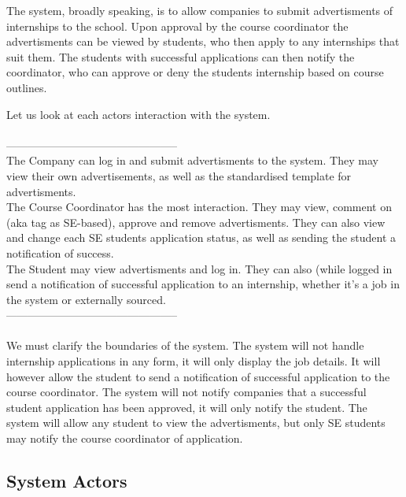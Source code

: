 \documentclass{l3deliverable}
\begin{document}

The system, broadly speaking, is to allow companies to submit advertisments 
of internships to the school. Upon approval by the course coordinator the 
advertisments can be viewed by students, who then apply to any internships 
that suit them. The students with successful applications can then notify 
the coordinator, who can approve or deny the students internship based on 
course outlines. 

Let us look at each actors interaction with the system.\\
\\
-----------------------------------------------\\
The Company can log in and submit advertisments to the system. They may 
view their own advertisements, as well as the standardised template for 
advertisments.\\

The Course Coordinator has the most interaction. They may view, comment 
on (aka tag as SE-based), approve and remove advertisments. They can also 
view and change each SE students application status, as well as sending 
the student a notification of success.\\

The Student may view advertisments and log in. They can also (while logged 
in send a notification of successful application to an internship, whether 
it's a job in the system or externally sourced.\\
-----------------------------------------------\\
\\
We must clarify the boundaries of the system. The system will not 
handle internship applications in any form, it will only display the 
job details. It will however allow the student to send a notification 
of successful application to the course coordinator. The system will 
not notify companies that a successful student application has been 
approved, it will only notify the student. The system will allow any 
student to view the advertisments, but only SE students may notify 
the course coordinator of application.


\subsection{System Actors}
\end{document}
